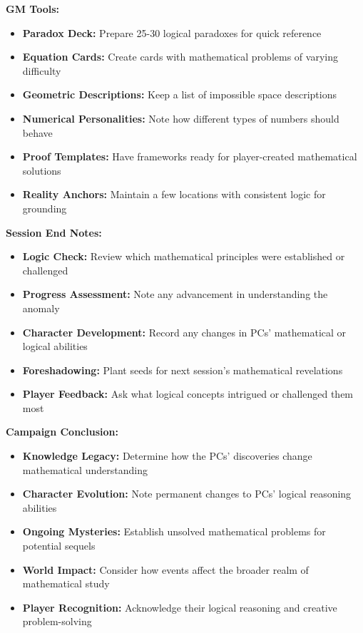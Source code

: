 \documentclass[11pt]{article}
\begin{document}
\textbf{GM Tools:}
\begin{itemize}
    \item \textbf{Paradox Deck:} Prepare 25-30 logical paradoxes for quick reference
    \item \textbf{Equation Cards:} Create cards with mathematical problems of varying difficulty
    \item \textbf{Geometric Descriptions:} Keep a list of impossible space descriptions
    \item \textbf{Numerical Personalities:} Note how different types of numbers should behave
    \item \textbf{Proof Templates:} Have frameworks ready for player-created mathematical solutions
    \item \textbf{Reality Anchors:} Maintain a few locations with consistent logic for grounding
\end{itemize}

\textbf{Session End Notes:}
\begin{itemize}
    \item \textbf{Logic Check:} Review which mathematical principles were established or challenged
    \item \textbf{Progress Assessment:} Note any advancement in understanding the anomaly
    \item \textbf{Character Development:} Record any changes in PCs' mathematical or logical abilities
    \item \textbf{Foreshadowing:} Plant seeds for next session's mathematical revelations
    \item \textbf{Player Feedback:} Ask what logical concepts intrigued or challenged them most
\end{itemize}

\textbf{Campaign Conclusion:}
\begin{itemize}
    \item \textbf{Knowledge Legacy:} Determine how the PCs' discoveries change mathematical understanding
    \item \textbf{Character Evolution:} Note permanent changes to PCs' logical reasoning abilities
    \item \textbf{Ongoing Mysteries:} Establish unsolved mathematical problems for potential sequels
    \item \textbf{World Impact:} Consider how events affect the broader realm of mathematical study
    \item \textbf{Player Recognition:} Acknowledge their logical reasoning and creative problem-solving
\end{itemize}
\end{document}
